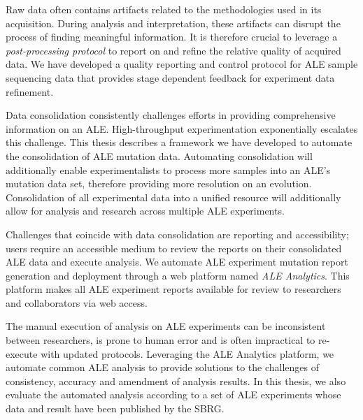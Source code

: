 \documentclass[12pt,final,masters,chapterheads]{ucsd}  %
\begin{document}
%
%
Raw data often contains artifacts related to the methodologies used in its acquisition. During analysis and interpretation, these artifacts can disrupt the process of finding meaningful information. It is therefore crucial to leverage a \textit{post-processing protocol} to report on and refine the relative quality of acquired data. We have developed a quality reporting and control protocol for ALE sample sequencing data that provides stage dependent feedback for experiment data refinement.

Data consolidation consistently challenges efforts in providing comprehensive information on an ALE. High-throughput experimentation exponentially escalates this challenge. This thesis describes a framework we have developed to automate the consolidation of ALE mutation data. Automating consolidation will additionally enable experimentalists to process more samples into an ALE's mutation data set, therefore providing more resolution on an evolution. Consolidation of all experimental data into a unified resource will additionally allow for analysis and research across multiple ALE experiments.

Challenges that coincide with data consolidation are reporting and accessibility; users require an accessible medium to review the reports on their consolidated ALE data and execute analysis. We automate ALE experiment mutation report generation and deployment through a web platform named \textit{ALE Analytics}. This platform makes all ALE experiment reports available for review to researchers and collaborators via web access.

The manual execution of analysis on ALE experiments can be inconsistent between researchers, is prone to human error and is often impractical to re-execute with updated protocols. Leveraging the ALE Analytics platform, we automate common ALE analysis to provide solutions to the challenges of consistency, accuracy and amendment of analysis results. In this thesis, we also evaluate the automated analysis according to a set of ALE experiments whose data and result have been published by the SBRG.
\end{document}

